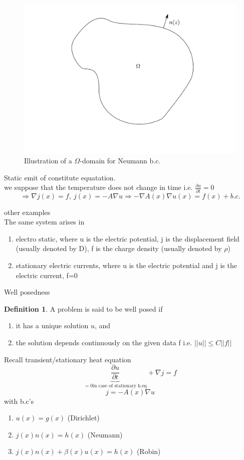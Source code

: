 \documentclass[english]{article}
\theoremstyle{definition}
\newtheorem*{defi}{Definition}
\theoremstyle{remark}
\newcommand{\f}[2]{\frac{#1}{#2}}							%
\newcommand{\p}{\partial}
\newcommand{\bb}{\beta}					%
\newcommand{\drw}{\Rightarrow}			%
\newcommand{\tri}{\nabla}
\newcommand{\tx}[1]{\text{#1}}
\begin{document}
\begin{figure}[tbh]
  \begin{center}
    \includegraphics[width=\textwidth]{figs/OmegaDomain.pdf}
  \end{center}
  \caption{Illustration of a $\Omega$-domain for Neumann b.c.}
  \label{omega-domain-figure}
\end{figure}

Static emit of constitute equatation.\\
we suppose that the temperature does not change in time i.e. $\f{\p u}{\p t}=0$
$$\drw \tri j(x) = f,\ j(x)=-A \tri u \drw -\tri A(x)\tri u(x) = f(x) + b.c.$$


other examples\\
The same system arises in 
\begin{enumerate}
\item electro static, where u is the electric potential, j is the displacement field (usually denoted by D), f is the charge density (usually denoted by $\rho$)
\item stationary electric currents, where u is the electric potential and j is the electric current, f=0
\end{enumerate}
Well posedness\\
\begin{defi} A problem is said to be well posed if 
  \begin{enumerate}
  \item it has a unique solution $u$, and
  \item the solution depends continuously on the given data f i.e. $||u||\leq C ||f||$
  \end{enumerate}
\end{defi}
Recall transient/stationary heat equation
$$\underbrace{\f{\p u}{\p t}}_{=0 \tx{in case of stationary h.eq}}+ \nabla j = f$$
$$j= -A(x)\nabla u$$
with b.c's
\begin{enumerate}
\item $u(x) = g(x)$ (Dirichlet)
\item $j(x) n(x) = h(x) $ (Neumann)
\item $j(x)n(x) + \bb (x) u(x) = h(x) $ (Robin)
\end{enumerate}
\end{document}
